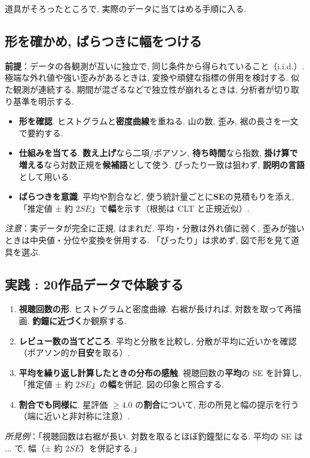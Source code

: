     道具がそろったところで, 実際のデータに当てはめる手順に入る.

  \subsection{形を確かめ, ばらつきに幅をつける}
    \noindent\textbf{前提}：データの各観測が互いに独立で, 同じ条件から得られていること（i.i.d.）. 極端な外れ値や強い歪みがあるときは, 変換や頑健な指標の併用を検討する. 似た観測が連続する, 期間が混ざるなどで独立性が崩れるときは, 分析者が切り取り基準を明示する.

    \begin{itemize}
      \item \textbf{形を確認}. ヒストグラムと\textbf{密度曲線}を重ねる.
            山の数, 歪み, 裾の長さを一文で要約する.
      \item \textbf{仕組みを当てる}. \textbf{数え上げ}なら二項/ポアソン, \textbf{待ち時間}なら指数, \textbf{掛け算で増える}なら対数正規を\textbf{候補語}として使う.
            ぴったり一致は狙わず, \textbf{説明の言語}として用いる.
      \item \textbf{ばらつきを意識}. 平均や割合など, 使う統計量ごとに\textbf{SE}の見積もりを添え, 「推定値 ± 約 $2SE$」で\textbf{幅}を示す（根拠は CLT と正規近似）.
    \end{itemize}

    \noindent\textit{注意}：実データが完全に正規, はまれだ. 平均・分散は外れ値に弱く, 歪みが強いときは中央値・分位や変換を併用する. 「ぴったり」は求めず, 図で形を見て道具を選ぶ.

  \subsection{実践 : 20作品データで体験する}
    \begin{enumerate}
      \item \textbf{視聴回数の形}. ヒストグラムと密度曲線. 右裾が長ければ, 対数を取って再描画. \textbf{釣鐘に近づく}か観察する.
      \item \textbf{レビュー数の当てどころ}. 平均と分散を比較し, 分散が平均に近いかを確認（ポアソン的か\textbf{目安}を取る）.
      \item \textbf{平均を繰り返し計算したときの分布の感触}. 視聴回数の\textbf{平均}の SE を計算し, 「推定値 ± 約 $2SE$」の\textbf{幅}を併記. 図の印象と照合する.
      \item \textbf{割合でも同様に}. 星評価 $\ge 4.0$ の\textbf{割合}について, 形の所見と幅の提示を行う（端に近いと非対称に注意）.
    \end{enumerate}
    \textit{所見例}：「視聴回数は右裾が長い. 対数を取るとほぼ釣鐘型になる. 平均の SE は $\ldots$ で, 幅（± 約 $2SE$）を併記する.」

